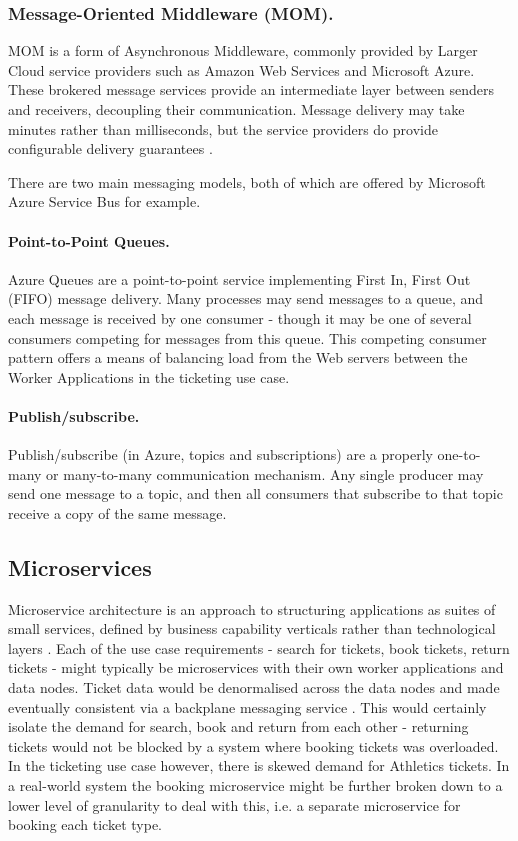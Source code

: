 \subsubsection{Message-Oriented Middleware (MOM).}  MOM is a form of Asynchronous Middleware, commonly provided by Larger Cloud service providers such as Amazon Web Services and Microsoft Azure.  These brokered message services provide an intermediate layer between senders and receivers, decoupling their communication.  Message delivery may take minutes rather than milliseconds, but the service providers do provide configurable delivery guarantees \cite{RN65}.

There are two main messaging models, both of which are offered by Microsoft Azure Service Bus \cite{RN1072} for example.

\paragraph{Point-to-Point Queues.} Azure Queues are a point-to-point service implementing First In, First Out (FIFO) message delivery. Many processes may send messages to a queue, and each message is received by one consumer - though it may be one of several consumers competing for messages from this queue.  This competing consumer pattern offers a means of balancing load from the Web servers between the Worker Applications in the ticketing use case.

\paragraph{Publish/subscribe.}  Publish/subscribe (in Azure, topics and subscriptions) are a properly one-to-many or many-to-many communication mechanism.  Any single producer may send one message to a topic, and then all consumers that subscribe to that topic receive a copy of the same message.

%
%

\subsection{Microservices}\label{sec:microservices}

Microservice architecture is an approach to structuring applications as suites of small services, defined by business capability verticals rather than technological layers \cite{RN1069} \cite{RN1070}.  Each of the use case requirements - search for tickets, book tickets, return tickets - might typically be microservices with their own worker applications and data nodes.  Ticket data would be denormalised across the data nodes and made eventually consistent via a backplane messaging service \cite{RN1071}.  This would certainly isolate the demand for search, book and return from each other - returning tickets would not be blocked by a system where booking tickets was overloaded.  In the ticketing use case however, there is skewed demand for Athletics tickets.  In a real-world system the booking microservice might be further broken down to a lower level of granularity to deal with this, i.e. a separate microservice for booking each ticket type.


